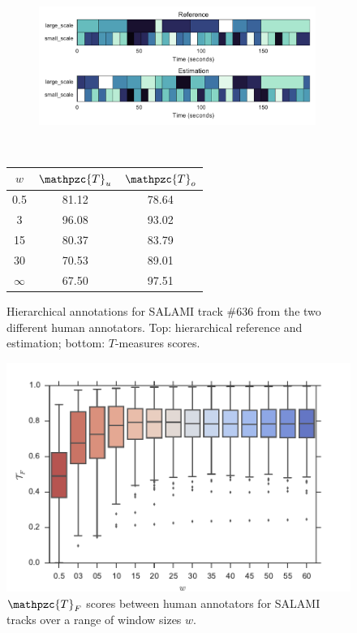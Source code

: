 \documentclass{article}
\def\shag{\ensuremath{\mathpzc{T}}}
\begin{document}
\begin{figure}[t]
  \centering
  \begin{subfigure}{0.5\textwidth}
    \centering
    \includegraphics[width=0.99\textwidth]{figs/SALAMI-SALAMI.pdf}
  \end{subfigure}%
  \\
  \begin{minipage}{0.5\textwidth}
    \centering
    \vspace{10pt}
    \begin{tabular}{|c|c|c|}
      \hline
      $w$       & $\shag_u$       & $\shag_o$      \\
      \hline
      0.5       & 81.12       & 78.64      \\     
      3         & 96.08       & 93.02      \\
      15        & 80.37       & 83.79    \\
      30        & 70.53       & 89.01    \\
      $\infty$  & 67.50       & 97.51    \\
      \hline
    \end{tabular}
  \end{minipage}
  \caption{Hierarchical annotations for SALAMI track \#636 from the two different human annotators. Top: hierarchical reference and estimation; bottom: $T$-measures scores.}
  \label{fig:SALAMI-SALAMI}
\end{figure}

\begin{figure}
    \centering
    \includegraphics[width=\columnwidth]{figs/tfw}
    \caption{$\shag_F$ scores between human annotators for SALAMI tracks over a range of window sizes $w$.\label{fig:salami-agree}}
\end{figure}
\end{document}
